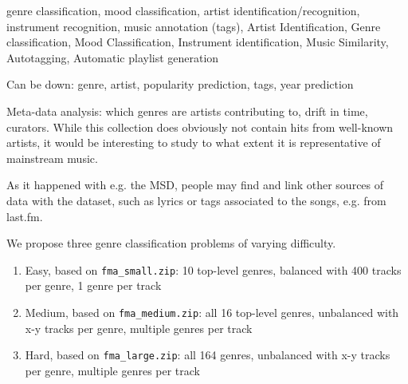 \documentclass{article}
\begin{document}


genre classification, mood classification, artist identification/recognition, instrument recognition, music annotation (tags),
Artist Identification, Genre classification, Mood Classification, Instrument identification, Music Similarity, Autotagging, Automatic playlist generation

Can be down: genre, artist, popularity prediction, tags, year prediction



Meta-data analysis: which genres are artists contributing to, drift in time, curators.
While this collection does obviously not contain hits from well-known artists, it would be interesting to study to what extent it is representative of mainstream music.

As it happened with e.g. the MSD, people may find and link other sources of data with the dataset, such as lyrics or tags associated to the songs, e.g. from last.fm.

We propose three genre classification problems of varying difficulty.

\begin{enumerate}
	\item Easy, based on \texttt{fma\_small.zip}: 10 top-level genres, balanced with 400 tracks per genre, 1 genre per track
	\item Medium, based on \texttt{fma\_medium.zip}: all 16 top-level genres, unbalanced with x-y tracks per genre, multiple genres per track
	\item Hard, based on \texttt{fma\_large.zip}: all 164 genres, unbalanced with x-y tracks per genre, multiple genres per track
\end{enumerate}
\end{document}
